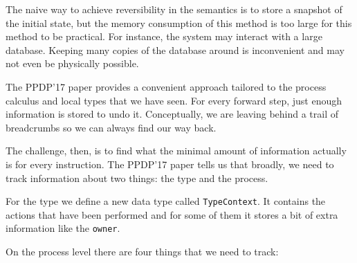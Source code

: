 \documentclass[runningheads,plain]{llncs}
\begin{document}
The naive way to achieve reversibility in the semantics is to store a
snapshot of the initial state, but the memory consumption of this method
is too large for this method to be practical. For instance, the system
may interact with a large database. Keeping many copies of the database
around is inconvenient and may not even be physically possible.

The PPDP'17 paper provides a convenient approach tailored to the process
calculus and local types that we have seen. For every forward step, just
enough information is stored to undo it. Conceptually, we are leaving
behind a trail of breadcrumbs so we can always find our way back.

The challenge, then, is to find what the minimal amount of information
actually is for every instruction. The PPDP'17 paper tells us that
broadly, we need to track information about two things: the type and the
process.

For the type we define a new data type called \texttt{TypeContext}. It
contains the actions that have been performed and for some of them it
stores a bit of extra information like the \texttt{owner}.

On the process level there are four things that we need to track:
\end{document}
